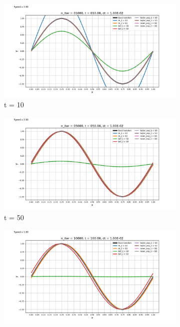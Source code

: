         \begin{figure}[H]
            \centering
            \begin{subfigure}{.5\textwidth}
                \centering
                \includegraphics[trim = 0cm 0cm 1cm 1cm, clip, width=\textwidth]{images/resultats/edp_advection_1.png}
                \caption{t = 10}
                \label{fig:edp_advection_1}
            \end{subfigure}
            \begin{subfigure}{.5\textwidth}
                \centering
                \includegraphics[trim = 0cm 0cm 1cm 0.5cm, clip, width=\textwidth]{images/resultats/edp_advection_2.png}
                \caption{t = 50}
                \label{fig:edp_advection_2}
            \end{subfigure}%
            \begin{subfigure}{.5\textwidth}
                \centering
                \includegraphics[trim = 0cm 0cm 1cm 0.5cm, clip, width=\textwidth]{images/resultats/edp_advection_3.png}

\end{subfigure}
\end{figure}
